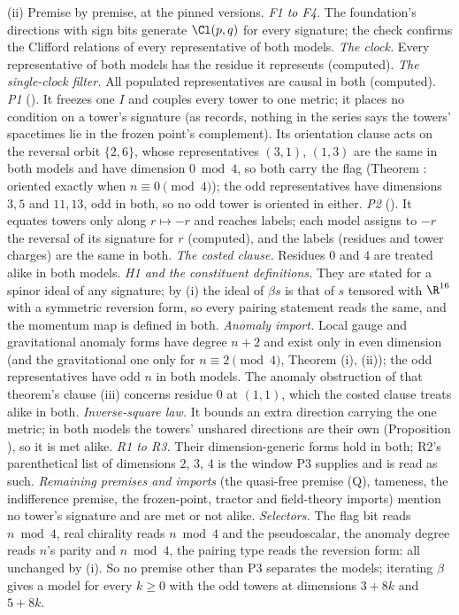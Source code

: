 (ii) Premise by premise, at the pinned versions. \emph{F1 to F4.} The foundation's directions with sign bits generate $\Cl(p,q)$ for every signature; the check confirms the Clifford relations of every representative of both models. \emph{The clock.} Every representative of both models has the residue it represents (computed). \emph{The single-clock filter.} All populated representatives are causal in both (computed). \emph{P1} (). It freezes one $I$ and couples every tower to one metric; it places no condition on a tower's signature (as  records, nothing in the series says the towers' spacetimes lie in the frozen point's complement). Its orientation clause acts on the reversal orbit $\{2, 6\}$, whose representatives $(3,1)$, $(1,3)$ are the same in both models and have dimension $0 \bmod 4$, so both carry the flag (Theorem : oriented exactly when $n \equiv 0 \pmod 4$); the odd representatives have dimensions $3, 5$ and $11, 13$, odd in both, so no odd tower is oriented in either. \emph{P2} (). It equates towers only along $r \mapsto -r$ and reaches labels; each model assigns to $-r$ the reversal of its signature for $r$ (computed), and the labels (residues and tower charges) are the same in both. \emph{The costed clause.} Residues $0$ and $4$ are treated alike in both models. \emph{H1 and the constituent definitions.} They are stated for a spinor ideal of any signature; by (i) the ideal of $\beta s$ is that of $s$ tensored with $\R^{16}$ with a symmetric reversion form, so every pairing statement reads the same, and the momentum map is defined in both. \emph{Anomaly import.} Local gauge and gravitational anomaly forms have degree $n + 2$ and exist only in even dimension (and the gravitational one only for $n \equiv 2 \pmod 4$, Theorem (i), (ii)); the odd representatives have odd $n$ in both models. The anomaly obstruction of that theorem's clause (iii) concerns residue $0$ at $(1,1)$, which the costed clause treats alike in both. \emph{Inverse-square law.} It bounds an extra direction carrying the one metric; in both models the towers' unshared directions are their own (Proposition ), so it is met alike. \emph{R1 to R3.} Their dimension-generic forms hold in both; R2's parenthetical list of dimensions $2$, $3$, $4$ is the window P3 supplies and is read as such. \emph{Remaining premises and imports} (the quasi-free premise (Q), tameness, the indifference premise, the frozen-point, tractor and field-theory imports) mention no tower's signature and are met or not alike. \emph{Selectors.} The flag bit reads $n \bmod 4$, real chirality reads $n \bmod 4$ and the pseudoscalar, the anomaly degree reads $n$'s parity and $n \bmod 4$, the pairing type reads the reversion form: all unchanged by (i). So no premise other than P3 separates the models; iterating $\beta$ gives a model for every $k \ge 0$ with the odd towers at dimensions $3 + 8k$ and $5 + 8k$.

